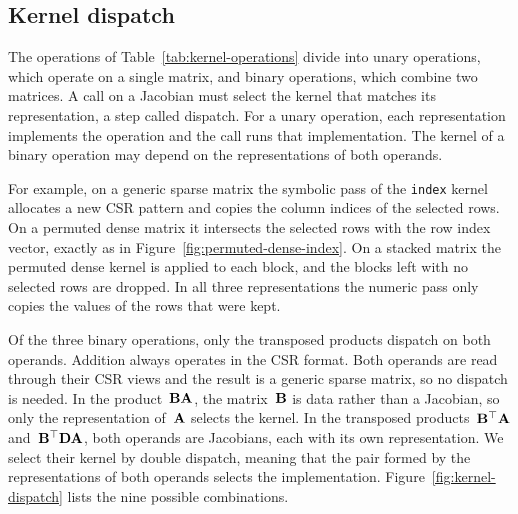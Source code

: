 \subsection{Kernel dispatch}\label{sec:theme1-kernel-dispatch}

The operations of Table~\ref{tab:kernel-operations} divide into unary operations, which
operate on a single matrix, and binary operations, which combine two matrices. A call on a
Jacobian must select the kernel that matches its representation, a step called dispatch.
For a unary operation, each representation implements the operation and the call runs that
implementation. The kernel of a binary operation may depend on the representations of both
operands.

For example, on a generic sparse matrix the symbolic pass of the \texttt{index} kernel
allocates a new CSR pattern and copies the column indices of the selected rows.
On a permuted dense matrix
it intersects the selected rows with the row index vector, exactly as in
Figure~\ref{fig:permuted-dense-index}. On a stacked matrix the permuted dense kernel is
applied to each block, and the blocks left with no selected rows are dropped. In all three
representations the numeric pass only copies the values of the rows that were kept.

Of the three binary operations, only the transposed products dispatch on both operands.
Addition always operates in the CSR format. Both operands are read through their CSR views
and the result is a generic sparse matrix, so no dispatch is needed.
In the product~$\mathbf{B}\mathbf{A}$, the matrix~$\mathbf{B}$ is data rather than a Jacobian, so
only the representation of~$\mathbf{A}$ selects the kernel. In the transposed
products~$\mathbf{B}^\top \mathbf{A}$ and~$\mathbf{B}^\top \mathbf{D} \mathbf{A}$, both operands are
Jacobians, each with its own representation. We select their kernel by
double dispatch, meaning that the pair formed by the representations of both operands
selects the implementation. Figure~\ref{fig:kernel-dispatch} lists the nine possible
combinations.

